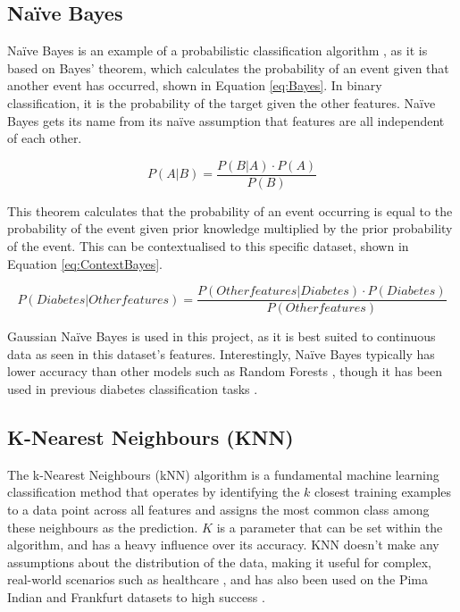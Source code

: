 \documentclass[12pt]{report}
\newcommand{\para}{\vspace{8pt}\noindent}
\begin{document}
\subsection{Na\"ive Bayes}
Na\"ive Bayes is an example of a probabilistic classification algorithm \autocite{ibm_what_2021}, as it is based on Bayes' theorem,
which calculates the probability of an event given that another event has occurred, shown in Equation \ref{eq:Bayes}. 
In binary classification, it is the probability of the target given the other features. Na\"ive Bayes gets its name from its na\"ive assumption
that features are all independent of each other.

\begin{equation}\label{eq:Bayes}
    P(A|B) = \frac{P(B|A) \cdot P(A)}{P(B)}
\end{equation}

\para This theorem calculates that the probability of an event occurring is equal to the probability of the event given 
prior knowledge multiplied by the prior probability of the event. This can be contextualised to this specific dataset, shown in Equation \ref{eq:ContextBayes}.

\begin{equation}\label{eq:ContextBayes}
    P(Diabetes | Other features) = \frac{P(Other features | Diabetes) \cdot P(Diabetes)}{P(Other features)}
\end{equation}

\para Gaussian Na\"ive Bayes is used in this project, as it is best suited to continuous data as seen in this dataset's 
features. Interestingly, Na\"ive Bayes typically has lower accuracy than other models such as Random Forests \autocite{khan_novel_2023},
though it has been used in previous diabetes classification tasks \autocite{aftab_cloud-based_2021, chang_pima_2023, zou_construction_2024}.

\subsection{K-Nearest Neighbours (KNN)}
The k-Nearest Neighbours (kNN) algorithm is a fundamental machine learning classification method that operates by identifying 
the $k$ closest training examples to a data point across all features and assigns the most common class among these neighbours 
as the prediction. $K$ is a parameter that can be set within the algorithm, and has a heavy influence over its accuracy.
KNN doesn't make any assumptions about the distribution of the data, making it useful for complex, real-world scenarios
such as healthcare \autocite{thomas_addressing_2021}, and has also been used on the Pima Indian and Frankfurt datasets
to high success \autocite{alzubi_diabetes_2023, zou_construction_2024}.
\end{document}
